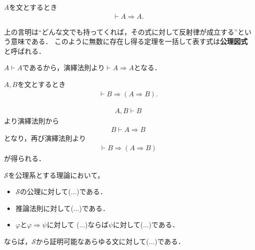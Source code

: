 	\begin{screen}
		\begin{logicalthm}[含意の反射律]\label{logicalthm:reflective_law_of_implication}
			$A$を文とするとき
			\begin{align}
				\vdash A \Longrightarrow A.
			\end{align}
		\end{logicalthm}
	\end{screen}
	
	上の言明は``どんな文でも持ってくれば，その式に対して反射律が成立する''という意味である．
	このように無数に存在し得る定理を一括して表す式は{\bf 公理図式}と呼ばれる．
	
	\begin{prf}
		$A \vdash A$であるから，演繹法則より$\vdash A \Longrightarrow A$となる．
		\QED
	\end{prf}
	
	\begin{screen}
		\begin{logicalthm}[正しい式は仮定を選ばない]\label{logicalthm:rule_of_inference_2}
			$A,B$を文とするとき
			\begin{align}
				\vdash B \Longrightarrow (A \Longrightarrow B).
			\end{align}
		\end{logicalthm}
	\end{screen}
	
	\begin{prf}
		\begin{align}
			A,B \vdash B
		\end{align}
		より演繹法則から
		\begin{align}
			B \vdash A \Longrightarrow B
		\end{align}
		となり，再び演繹法則より
		\begin{align}
			\vdash B \Longrightarrow (A \Longrightarrow B)
		\end{align}
		が得られる．
		\QED
	\end{prf}
	
	\begin{screen}
		\begin{metaaxm}[証明に対する構造的帰納法]
			$\mathscr{S}$を公理系とする理論において，
			\begin{itemize}
				\item $\mathscr{S}$の公理に対して(...)である．
				\item 推論法則に対して(...)である．
				\item $\varphi$と$\varphi \Longrightarrow \psi$に対して
					(...)ならば$\psi$に対して(...)である．
			\end{itemize}
			ならば，$\mathscr{S}$から証明可能なあらゆる文に対して(...)である．
		\end{metaaxm}
	\end{screen}
	
